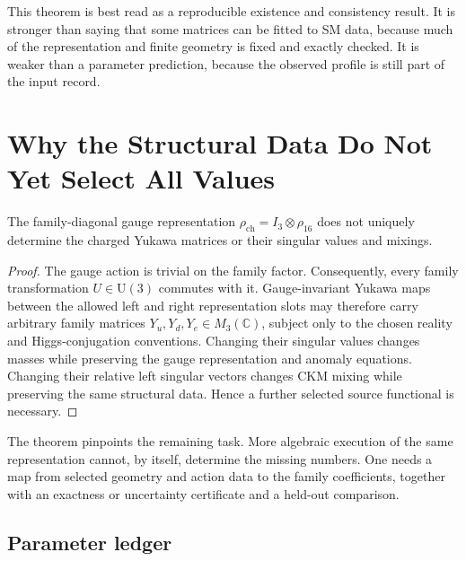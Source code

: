\documentclass[11pt]{article}
\newcommand{\C}{\mathbb{C}}
\newcommand{\U}{\mathrm{U}}
\begin{document}
This theorem is best read as a reproducible existence and consistency result.  It is stronger
than saying that some matrices can be fitted to SM data, because much of the representation and
finite geometry is fixed and exactly checked.  It is weaker than a parameter prediction, because
the observed profile is still part of the input record.

\section{Why the Structural Data Do Not Yet Select All Values}

\begin{theorem}
The family-diagonal gauge representation
$\rho_{\mathrm{ch}}=I_3\otimes\rho_{16}$ does not uniquely determine the charged Yukawa matrices
or their singular values and mixings.
\end{theorem}
\begin{proof}
The gauge action is trivial on the family factor.  Consequently, every family transformation
$U\in\U(3)$ commutes with it.  Gauge-invariant Yukawa maps between the allowed left and right
representation slots may therefore carry arbitrary family matrices
$Y_u,Y_d,Y_e\in M_3(\C)$, subject only to the chosen reality and Higgs-conjugation conventions.
Changing their singular values changes masses while preserving the gauge representation and
anomaly equations.  Changing their relative left singular vectors changes CKM mixing while
preserving the same structural data.  Hence a further selected source functional is necessary.
\end{proof}

The theorem pinpoints the remaining task.  More algebraic execution of the same representation
cannot, by itself, determine the missing numbers.  One needs a map from selected geometry and
action data to the family coefficients, together with an exactness or uncertainty certificate
and a held-out comparison.

\subsection{Parameter ledger}
\end{document}
